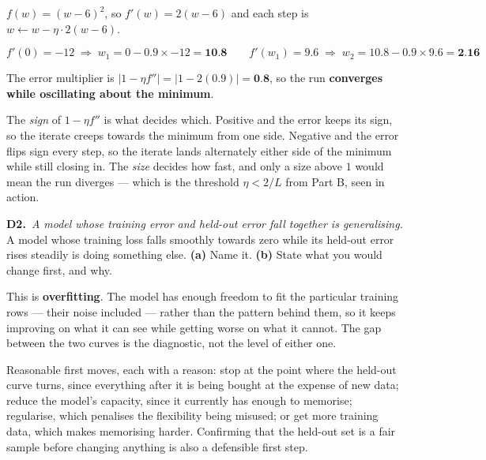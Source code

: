 \documentclass[10pt,a4paper]{article}
\newcommand{\sol}[1]{\textbf{#1}}
\begin{document}
\vspace{2pt}

$f(w) = (w-6)^2$, so $f'(w) = 2(w-6)$ and each step is $w \leftarrow w - \eta \cdot 2(w-6)$.

\[ f'(0) = -12 \;\Rightarrow\; w_1 = 0 - 0.9 \times -12 = \sol{10.8} \qquad f'(w_1) = 9.6 \;\Rightarrow\; w_2 = 10.8 - 0.9 \times 9.6 = \sol{2.16} \]

The error multiplier is $\lvert 1 - \eta f'' \rvert = \lvert 1 - 2(0.9) \rvert = \sol{0.8}$, so the run \sol{converges while oscillating about the minimum}.

\vspace{2pt}

The \emph{sign} of $1 - \eta f''$ is what decides which. Positive and the error keeps its sign, so the iterate creeps towards the minimum from one side. Negative and the error flips sign every step, so the iterate lands alternately either side of the minimum while still closing in. The \emph{size} decides how fast, and only a size above $1$ would mean the run diverges --- which is the threshold $\eta < 2/L$ from Part B, seen in action.

\vspace{6pt}

\textbf{D2.}\ \emph{A model whose training error and held-out error fall together is generalising.} A model whose training loss falls smoothly towards zero while its held-out error rises steadily is doing something else. \textbf{(a)} Name it. \textbf{(b)} State what you would change first, and why.

\vspace{2pt}

This is \textbf{overfitting}. The model has enough freedom to fit the particular training rows --- their noise included --- rather than the pattern behind them, so it keeps improving on what it can see while getting worse on what it cannot. The gap between the two curves is the diagnostic, not the level of either one.\par\vspace{1mm}Reasonable first moves, each with a reason: stop at the point where the held-out curve turns, since everything after it is being bought at the expense of new data; reduce the model's capacity, since it currently has enough to memorise; regularise, which penalises the flexibility being misused; or get more training data, which makes memorising harder. Confirming that the held-out set is a fair sample before changing anything is also a defensible first step.
\end{document}
